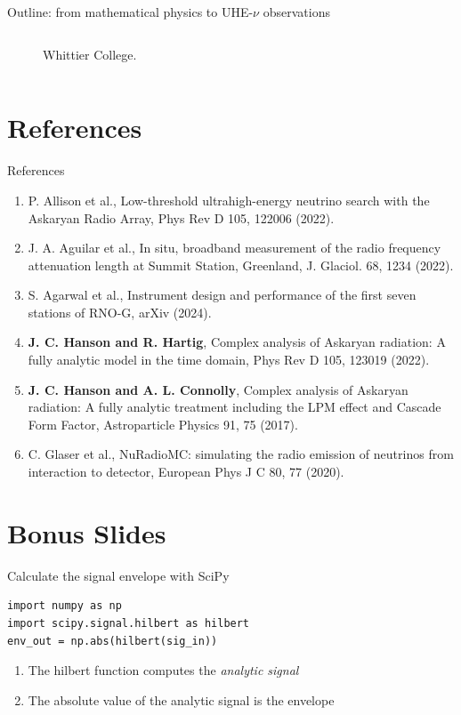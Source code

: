 \documentclass{beamer}
\begin{document}
\begin{frame}{Outline: from mathematical physics to UHE-$\nu$ observations}
\begin{columns}[T]
\begin{column}{0.5\textwidth}
\begin{figure}
\caption{\small Whittier College.}
\end{figure}
\end{column}
\end{columns}
\end{frame}

\section{References}

\begin{frame}{References}
\footnotesize
\begin{enumerate}
\item P. Allison et al., Low-threshold ultrahigh-energy neutrino search with the Askaryan Radio Array, Phys Rev D 105, 122006 (2022).
\item J. A. Aguilar et al., In situ, broadband measurement of the radio frequency attenuation length at Summit Station, Greenland, J. Glaciol. 68, 1234 (2022).
\item S. Agarwal et al., Instrument design and performance of the first seven stations of RNO-G, arXiv (2024).
\item \textbf{J. C. Hanson and R. Hartig}, Complex analysis of Askaryan radiation: A fully analytic model in the time domain, Phys Rev D 105, 123019 (2022).
\item \textbf{J. C. Hanson and A. L. Connolly}, Complex analysis of Askaryan radiation: A fully analytic treatment including the LPM effect and Cascade Form Factor, Astroparticle Physics 91, 75 (2017).
\item C. Glaser et al., NuRadioMC: simulating the radio emission of neutrinos from interaction to detector, European Phys J C 80, 77 (2020).
\end{enumerate}
\end{frame}

\section{Bonus Slides}

\begin{frame}[fragile]{Calculate the signal envelope with SciPy}
\begin{verbatim}
import numpy as np
import scipy.signal.hilbert as hilbert
env_out = np.abs(hilbert(sig_in))
\end{verbatim}
\begin{enumerate}
\item The hilbert function computes the \textit{analytic signal}
\item The absolute value of the analytic signal is the envelope
\end{enumerate}
\end{frame}
\end{document}
